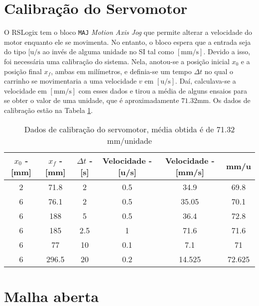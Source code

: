 
\section{Calibração do Servomotor\label{calibracaoServomotorSecao}}

O RSLogix tem o bloco \texttt{MAJ} \textendash{} \textit{Motion Axis Jog} \textendash{} que permite alterar a velocidade do motor enquanto ele se movimenta. No entanto, o bloco espera que a entrada seja do tipo $[\mathrm{u}/\mathrm{s}$ ao invés de alguma unidade no SI tal como $[\mathrm{mm}/\mathrm{s}]$. Devido a isso, foi necessária uma calibração do sistema. Nela, anotou-se a posição inicial $x_0$ e a posição final $x_f$, ambas em milímetros, e definia-se um tempo $\Delta t$ no qual o carrinho se movimentaria a uma velocidade $v$ em $[\mathrm{u}/\mathrm{s}]$. Daí, calculava-se a velocidade em $[\mathrm{mm}/\mathrm{s}]$ com esses dados e tirou a média de alguns ensaios para se obter o valor de uma unidade, que é aproximadamente $71.32\mathrm{mm}$. Os dados de calibração estão na Tabela \ref{calibracaoServomotor}.

\begin{table}[!ht]
\centering
\caption{Dados de calibração do servomotor, média obtida é de 71.32 mm/unidade\label{calibracaoServomotor}}
\begin{tabular}{|c|c|c|c|c|c|}
\hline
	$x_0$ - [mm] & $x_f$ - [mm] & $\Delta t$ - [s] & Velocidade - [u/s] & Velocidade - [mm/s] & mm/u\\ \hline
2 &	71.8  &	2   &	0.5 &	34.9   & 	69.8\\ \hline
6 & 76.1  &	2   &	0.5 &	35.05  &	70.1\\ \hline
6 &	188	  &  5   &	0.5	&   36.4   &	72.8\\ \hline
6 &	185   &	2.5 &	1	& 	71.6   &	71.6\\ \hline
6 &	77    &	10  &	0.1	&   7.1    &	71\\ \hline
6 &	296.5 &	20	&   0.2 & 	14.525 &	72.625\\ \hline\end{tabular}
\end{table}

\section{Malha aberta}

